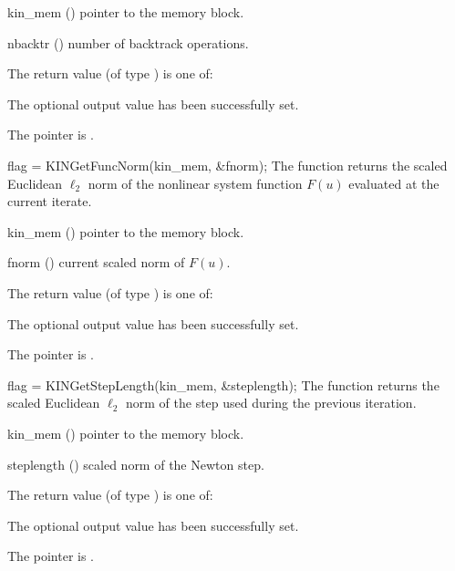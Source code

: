 {
  \begin{args}
  \item[kin\_mem] ()
    pointer to the {\kinsol} memory block.
  \item[nbacktr] ()
    number of backtrack operations.
  \end{args}
}
{
  The return value  (of type ) is one of:
  \begin{args}
  \item[\Id{KIN\_SUCCESS}]
    The optional output value has been successfully set.
  \item[\Id{KIN\_MEM\_NULL}]
    The  pointer is .
  \end{args}
}
{}
{
  flag = KINGetFuncNorm(kin\_mem, \&fnorm);
}
{
  The function  returns the scaled Euclidean $\ell_2$ norm of the
  nonlinear system function $F(u)$ evaluated at the current iterate.
}
{
  \begin{args}
  \item[kin\_mem] ()
    pointer to the {\kinsol} memory block.
  \item[fnorm] ()
    current scaled norm of $F(u)$.
  \end{args}
}
{
  The return value  (of type ) is one of:
  \begin{args}
  \item[\Id{KIN\_SUCCESS}]
    The optional output value has been successfully set.
  \item[\Id{KIN\_MEM\_NULL}]
    The  pointer is .
  \end{args}
}
{}
{
  flag = KINGetStepLength(kin\_mem, \&steplength);
}
{
  The function  returns the scaled Euclidean $\ell_2$ norm of
  the step used during the previous iteration.
}
{
  \begin{args}[steplength]
  \item[kin\_mem] ()
    pointer to the {\kinsol} memory block.
  \item[steplength] ()
    scaled norm of the Newton step.
  \end{args}
}
{
  The return value  (of type ) is one of:
  \begin{args}
  \item[\Id{KIN\_SUCCESS}]
    The optional output value has been successfully set.
  \item[\Id{KIN\_MEM\_NULL}]
    The  pointer is .
  \end{args}
}
{}

